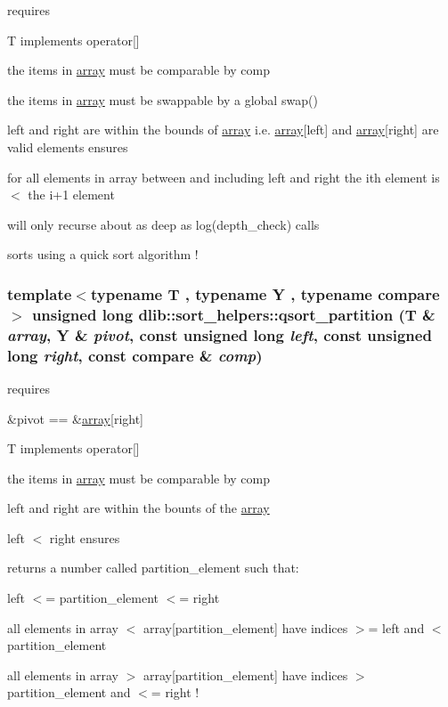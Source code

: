 \label{namespacedlib_1_1sort__helpers_ab2a0fe3633430a6436f3997846e2b231}
requires
\begin{DoxyItemize}
\item T implements operator\mbox{[}\mbox{]}
\item the items in \hyperlink{classdlib_1_1array}{array} must be comparable by comp
\item the items in \hyperlink{classdlib_1_1array}{array} must be swappable by a global swap()
\item left and right are within the bounds of \hyperlink{classdlib_1_1array}{array} i.e. \hyperlink{classdlib_1_1array}{array}\mbox{[}left\mbox{]} and \hyperlink{classdlib_1_1array}{array}\mbox{[}right\mbox{]} are valid elements ensures
\item for all elements in array between and including left and right the ith element is $<$ the i+1 element
\item will only recurse about as deep as log(depth\_\-check) calls
\item sorts using a quick sort algorithm ! 
\end{DoxyItemize}\hypertarget{namespacedlib_1_1sort__helpers_a57c163f0e0bcd4ba7f32d5457a6397df}{
\subsubsection[{qsort\_\-partition}]{\setlength{\rightskip}{0pt plus 5cm}template$<$typename T , typename Y , typename compare $>$ unsigned long dlib::sort\_\-helpers::qsort\_\-partition (T \& {\em array}, \/  Y \& {\em pivot}, \/  const unsigned long {\em left}, \/  const unsigned long {\em right}, \/  const compare \& {\em comp})}}
\label{namespacedlib_1_1sort__helpers_a57c163f0e0bcd4ba7f32d5457a6397df}
requires
\begin{DoxyItemize}
\item \&pivot == \&\hyperlink{classdlib_1_1array}{array}\mbox{[}right\mbox{]}
\item T implements operator\mbox{[}\mbox{]}
\item the items in \hyperlink{classdlib_1_1array}{array} must be comparable by comp
\item left and right are within the bounts of the \hyperlink{classdlib_1_1array}{array}
\item left $<$ right ensures
\item returns a number called partition\_\-element such that:
\begin{DoxyItemize}
\item left $<$= partition\_\-element $<$= right
\item all elements in array $<$ array\mbox{[}partition\_\-element\mbox{]} have indices $>$= left and $<$ partition\_\-element
\item all elements in array $>$ array\mbox{[}partition\_\-element\mbox{]} have indices $>$ partition\_\-element and $<$= right ! 
\end{DoxyItemize}
\end{DoxyItemize}